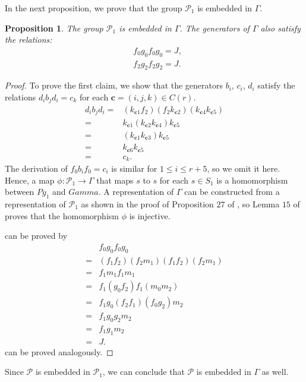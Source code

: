 \documentclass[11pt,letterpaper]{article}
\newcommand{\1}{\mathbb{1}}
\newcommand{\Pg}{\mathcal{P}}
\newcommand{\bc}{\pmb{c}}
\newtheorem{proposition}[theorem]{Proposition}
\theoremstyle{definition}
\begin{document}
In the next proposition, we prove that the group $\Pg_1$ is embedded in $\Gamma$.
\begin{proposition}
    \label{prop:g1gamma}
	The group $\Pg_1$ is embedded in $\Gamma$.
	The generators of $\Gamma$ also satisfy the relations: 
	\begin{align}
	    \label{eq:mg1} &f_0 g_0 f_0 g_0 = J,\\
	    \label{eq:mg2} &f_2 g_2 f_2 g_2 = J.
	\end{align}
\end{proposition}
\begin{proof}
    To prove the first claim, we show that the generators
    $b_i$, $c_i$, $d_i$ satisfy the relations
    $d_ib_jd_i = c_k$ for each $\bc = (i,j,k) \in C(r)$.
    \begin{align*}
        d_ib_jd_i =& (k_{\bc 1} f_2)(f_2 k_{\bc 2})(k_{\bc 4} k_{\bc 5})\\ 
        =& k_{\bc 1}(k_{\bc 2}k_{\bc 4})k_{\bc 5} \\
        =& (k_{\bc 1} k_{\bc 3}) k_{\bc 5} \\
        =& k_{\bc 6} k_{\bc 5} \\
        =& c_k.
    \end{align*}
    The derivation of $f_0 b_i f_0 = c_i$ is similar for $1 \leq i \leq r+5$, so we omit it here.
    Hence, a map $\phi:\Pg_1 \rightarrow \Gamma$ that maps $s$
    to $s$ for each $s \in S_1$ is a homomorphism between $Pg_1$ and 
    $Gamma$. 
    A representation of $\Gamma$ can be constructed from a representation 
    of $\Pg_1$ as shown in the proof of Proposition $27$ of \cite{slofstra2017},
    so Lemma $15$ of \cite{slofstra2017} proves that
    the homomorphism $\phi$ is injective.
    
     can be proved by
    \begin{align*}
        &f_0 g_0 f_0 g_0 \\
        = &(f_1 f_2) (f_2 m_1)  (f_1 f_2) (f_2 m_1)\\
        = &f_1 m_1 f_1 m_1 \\
        = &f_1 (g_0 f_2) f_1 (m_0 m_2) \\
        = &f_1 g_0 (f_2 f_1) (f_0 g_2) m_2 \\
        = &f_1 g_0 g_2 m_2 \\
        = &f_1 g_1 m_2 \\
        = &J.
    \end{align*}
     can be proved analogously.
\end{proof}
Since $\Pg$ is embedded in $\Pg_1$, we can conclude that
$\Pg$ is embedded in $\Gamma$ as well.
\end{document}
